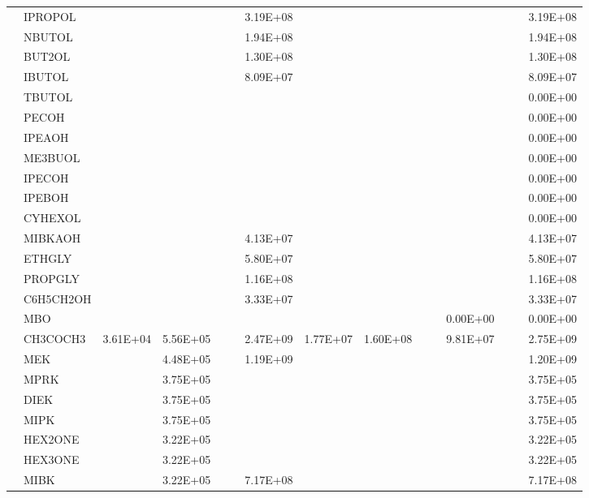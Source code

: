 \begin{longtable}{lllllllllllllll}
	 & IPROPOL &  &  &  &  & 3.19E+08 &  &  &  &  &  &  &  & 3.19E+08 \\*
	 & NBUTOL &  &  &  &  & 1.94E+08 &  &  &  &  &  &  &  & 1.94E+08 \\
	 & BUT2OL &  &  &  &  & 1.30E+08 &  &  &  &  &  &  &  & 1.30E+08 \\
	 & IBUTOL &  &  &  &  & 8.09E+07 &  &  &  &  &  &  &  & 8.09E+07 \\
	 & TBUTOL &  &  &  &  &  &  &  &  &  &  &  &  & 0.00E+00 \\
	 & PECOH &  &  &  &  &  &  &  &  &  &  &  &  & 0.00E+00 \\
	 & IPEAOH &  &  &  &  &  &  &  &  &  &  &  &  & 0.00E+00 \\
	 & ME3BUOL &  &  &  &  &  &  &  &  &  &  &  &  & 0.00E+00 \\
	 & IPECOH &  &  &  &  &  &  &  &  &  &  &  &  & 0.00E+00 \\
	 & IPEBOH &  &  &  &  &  &  &  &  &  &  &  &  & 0.00E+00 \\
	 & CYHEXOL &  &  &  &  &  &  &  &  &  &  &  &  & 0.00E+00 \\
	 & MIBKAOH &  &  &  &  & 4.13E+07 &  &  &  &  &  &  &  & 4.13E+07 \\
	 & ETHGLY &  &  &  &  & 5.80E+07 &  &  &  &  &  &  &  & 5.80E+07 \\
	 & PROPGLY &  &  &  &  & 1.16E+08 &  &  &  &  &  &  &  & 1.16E+08 \\
	 & C6H5CH2OH &  &  &  &  & 3.33E+07 &  &  &  &  &  &  &  & 3.33E+07 \\
	 & MBO &  &  &  &  &  &  &  &  &  & 0.00E+00 &  &  & 0.00E+00 \\
	\hline \parbox[t]{2mm}{} & CH3COCH3 & 3.61E+04 & 5.56E+05 &  &  & 2.47E+09 & 1.77E+07 & 1.60E+08 &  &  & 9.81E+07 &  &  & 2.75E+09 \\
	 & MEK &  & 4.48E+05 &  &  & 1.19E+09 &  &  &  &  &  &  &  & 1.20E+09 \\
	 & MPRK &  & 3.75E+05 &  &  &  &  &  &  &  &  &  &  & 3.75E+05 \\
	 & DIEK &  & 3.75E+05 &  &  &  &  &  &  &  &  &  &  & 3.75E+05 \\
	 & MIPK &  & 3.75E+05 &  &  &  &  &  &  &  &  &  &  & 3.75E+05 \\
	 & HEX2ONE &  & 3.22E+05 &  &  &  &  &  &  &  &  &  &  & 3.22E+05 \\
	 & HEX3ONE &  & 3.22E+05 &  &  &  &  &  &  &  &  &  &  & 3.22E+05 \\
	 & MIBK &  & 3.22E+05 &  &  & 7.17E+08 &  &  &  &  &  &  &  & 7.17E+08 \\

\end{longtable}
